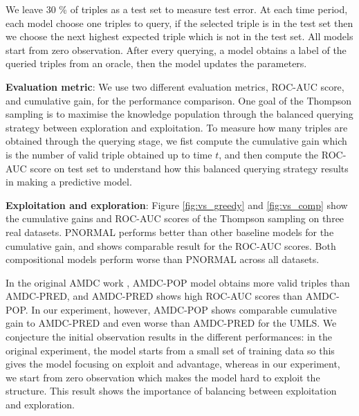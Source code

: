 We leave 30 \% of triples as a test set to measure test error. 
At each time period, each model choose one triples to query, 
if the selected triple is in the test set then we choose the next highest expected triple which is not in the test set.
All models start from zero observation. 
After every querying, a model obtains a label of the queried triples from an oracle,
then the model updates the parameters. 

\textbf{Evaluation metric}: We use two different evaluation metrics, ROC-AUC score, and cumulative gain,
for the performance comparison. One goal of the Thompson sampling is to maximise the knowledge 
population through the balanced querying strategy between exploration and exploitation. 
To measure how many triples are obtained through the querying stage, we fist compute the cumulative 
gain which is the number of valid triple obtained up to time $t$, and then compute the ROC-AUC score on 
test set to understand how this balanced querying strategy results in making a predictive model.

\textbf{Exploitation and exploration}: 
Figure \ref{fig:vs_greedy} and \ref{fig:vs_comp} show
the cumulative gains and ROC-AUC scores of the Thompson sampling on three real datasets.
PNORMAL performs better than other baseline models for the cumulative gain, and shows comparable result for the ROC-AUC scores. Both compositional models perform worse than PNORMAL across all datasets.

In the original AMDC work \cite{kajino2015active}, AMDC-POP model obtains more 
valid triples than AMDC-PRED, and AMDC-PRED shows high ROC-AUC scores than AMDC-POP. 
In our experiment, however, AMDC-POP shows comparable cumulative gain to AMDC-PRED 
and even worse than AMDC-PRED for the UMLS. We conjecture the initial observation 
results in the  different performances: in the original experiment, the model starts
from a small set of training data so this gives the model focusing on exploit and advantage, 
whereas in our experiment, we start from zero 
observation which makes the model hard to exploit the structure. This result shows 
the importance of balancing between exploitation and exploration.

